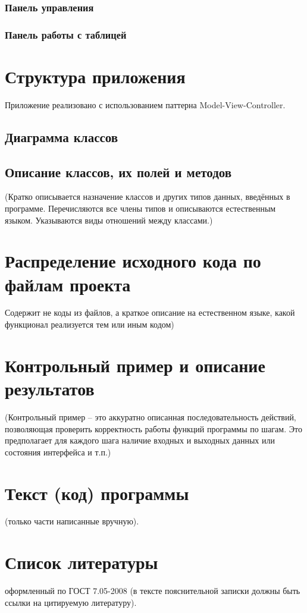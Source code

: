 \documentclass[a4paper,12pt, fleqn]{article}
\theoremstyle{plain} %
\theoremstyle{definition} %
\theoremstyle{remark} %
\numberwithin{equation}{section}
\begin{document}
\subsubsection{Панель управления}
\subsubsection{Панель работы с таблицей}


\section{Структура приложения}
Приложение реализовано с использованием паттерна Model-View-Controller.
\subsection{Диаграмма классов}

\subsection{Описание классов, их полей и методов}
(Кратко описывается назначение классов и других типов данных, введённых в программе. Перечисляются все члены типов и описываются естественным языком. Указываются виды отношений между классами.)


\section{Распределение исходного кода по файлам проекта}
Содержит не коды из файлов, а краткое описание на естественном языке, какой функционал реализуется тем или иным кодом)


\section{Контрольный пример и описание результатов}
(Контрольный пример – это аккуратно описанная последовательность действий, позволяющая проверить корректность работы функций программы по шагам. Это предполагает для каждого шага наличие входных и выходных данных или состояния интерфейса и т.п.)


\section{Текст (код) программы}
(только части написанные вручную).


\section{Список литературы}
оформленный по ГОСТ 7.05-2008 (в тексте пояснительной записки должны быть ссылки на цитируемую литературу). 
\end{document}
